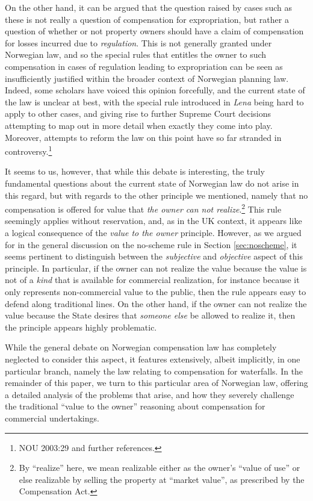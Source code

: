On the other hand, it can be argued that the question raised by cases such as these is not really a question of compensation for expropriation, but rather a question of whether or not property owners should have a claim of compensation for losses incurred due to \emph{regulation}. This is not generally granted under Norwegian law, and so the special rules that entitles the owner to such compensation in cases of regulation leading to expropriation can be seen as insufficiently justified within the broader context of Norwegian planning law. Indeed, some scholars have voiced this opinion forcefully, and the current state of the law is unclear at best, with the special rule introduced in \emph{Lena} being hard to apply to other cases, and giving rise to further Supreme Court decisions attempting to map out in more detail when exactly they come into play. Moreover, attempts to reform the law on this point have so far stranded in controversy.\footnote{NOU 2003:29 and further references.}

It seems to us, however, that while this debate is interesting, the truly fundamental questions about the current state of Norwegian law do not arise in this regard, but with regards to the other principle we mentioned, namely that no compensation is offered for value that \emph{the owner can not realize}.\footnote{By ``realize'' here, we mean realizable either as the owner's ``value of use'' or else realizable by selling the property at ``market value'', as prescribed by the Compensation Act.} This rule seemingly applies without reservation, and, as in the UK context, it appears like a logical consequence of the \emph{value to the owner} principle. However, as we argued for in the general discussion on the no-scheme rule in Section \ref{sec:noscheme}, it seems pertinent to distinguish between the \emph{subjective} and \emph{objective} aspect of this principle. In particular, if the owner can not realize the value because the value is not of a \emph{kind} that is available for commercial realization, for instance because it only represents non-commercial value to the public, then the rule appears easy to defend along traditional lines. On the other hand, if the owner can not realize the value because the State desires that \emph{someone else} be allowed to realize it, then the principle appears highly problematic.

While the general debate on Norwegian compensation law has completely neglected to consider this aspect, it features extensively, albeit implicitly, in one particular branch, namely the law relating to compensation for waterfalls. In the remainder of this paper, we turn to this particular area of Norwegian law, offering a detailed analysis of the problems that arise, and how they severely challenge the traditional ``value to the owner'' reasoning about compensation for commercial undertakings. 

